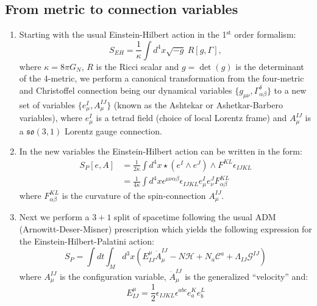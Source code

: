 \documentclass[preprint]{SciPost}
\newcommand{\mc}[1]{\mathcal{#1}}
\newcommand{\mf}[1]{\mathfrak{#1}}
\newcommand{\supersc}[1]{$^{\textrm{#1}}$}
\theoremstyle{plain} %
\begin{document}
\subsection*{From metric to connection variables}
	\begin{enumerate}[label=\arabic*.]
		\item Starting with the usual Einstein-Hilbert action in the 1\supersc{st} order formalism:
		\begin{equation}
		S_{EH} = \frac{1}{\kappa} \int d^4x \sqrt{-g}~R[g,\Gamma],
		\end{equation}
		where $ \kappa = 8 \pi G_N $, $ R $ is the Ricci scalar and $ g = \det(g) $ is the determinant of the 4-metric, we perform a canonical transformation \cite{Ashtekar1986New-Variables,Ashtekar1987New-Hamiltonian} from the four-metric and Christoffel connection being our dynamical variables $ \{g_{\mu\nu}, \Gamma_{\alpha\beta}^\delta \} $ to a new set of variables $ \{ e_\mu^I, A_\mu^{IJ} \} $ (known as the Ashtekar or Ashetkar-Barbero variables), where $ e_\mu^I $ is a tetrad field (choice of local Lorentz frame) and $ A_\mu^{IJ} $ is a $ \mf{so}(3,1) $ Lorentz gauge connection.
		\item In the new variables the Einstein-Hilbert action can be written in the form:
		\begin{align}\label{eqn:eh-tetrad-action}
		S_{P}[e, A] & =\frac{1}{2 \kappa} \int d^{4} x \star\left(e^{I} \wedge e^{J}\right) \wedge F^{K L} \epsilon_{I J K L} \nonumber \\
		& = \frac{1}{4 \kappa} \int d^{4} x \epsilon^{\mu \nu \alpha \beta} \epsilon_{I J K L} e_{\mu}^{I} e_{\nu}^{J} F_{\alpha \beta}^{K L}
		\end{align}
		where $ F_{\alpha \beta}^{K L} $ is the curvature of the spin-connection $ A_\mu^{IJ} $.
		\item Next we perform a $ 3+1 $ split of spacetime following the usual ADM (Arnowitt-Deser-Misner) prescription which yields the following expression for the Einstein-Hilbert-Palatini action:
		\begin{equation}\label{eqn:eh-tetrad-adm}
		S_{P}= \int d t \int_M d^{3} x\left(E^\mu_{IJ} \dot A_\mu^{IJ} - N \mathcal{H} + N_{a} \mathcal{C}^{a} + \Lambda_{IJ} \mc{G}^{IJ} \right)
		\end{equation}
		where $ A_\mu^{IJ} $ is the configuration variable, $ \dot A_\mu^{IJ} $ is the generalized ``velocity'' and:
		\begin{equation}\label{eqn:adm-momentum}
		E^\mu_{IJ} = \frac{1}{2} \epsilon_{IJKL} \epsilon^{abc} e_a^K e_b^L

\end{equation}
\end{enumerate}
\end{document}
